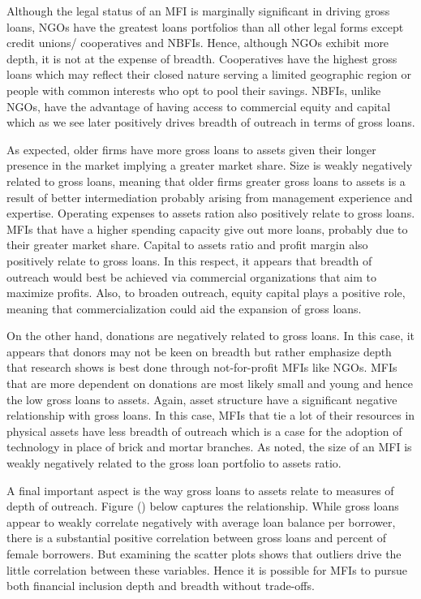 \documentclass[
]{article}
\begin{document}
Although the legal status of an MFI is marginally significant in driving
gross loans, NGOs have the greatest loans portfolios than all other
legal forms except credit unions/ cooperatives and NBFIs. Hence,
although NGOs exhibit more depth, it is not at the expense of breadth.
Cooperatives have the highest gross loans which may reflect their closed
nature serving a limited geographic region or people with common
interests who opt to pool their savings. NBFIs, unlike NGOs, have the
advantage of having access to commercial equity and capital which as we
see later positively drives breadth of outreach in terms of gross loans.

As expected, older firms have more gross loans to assets given their
longer presence in the market implying a greater market share. Size is
weakly negatively related to gross loans, meaning that older firms
greater gross loans to assets is a result of better intermediation
probably arising from management experience and expertise. Operating
expenses to assets ration also positively relate to gross loans. MFIs
that have a higher spending capacity give out more loans, probably due
to their greater market share. Capital to assets ratio and profit margin
also positively relate to gross loans. In this respect, it appears that
breadth of outreach would best be achieved via commercial organizations
that aim to maximize profits. Also, to broaden outreach, equity capital
plays a positive role, meaning that commercialization could aid the
expansion of gross loans.

On the other hand, donations are negatively related to gross loans. In
this case, it appears that donors may not be keen on breadth but rather
emphasize depth that research shows is best done through not-for-profit
MFIs like NGOs. MFIs that are more dependent on donations are most
likely small and young and hence the low gross loans to assets. Again,
asset structure have a significant negative relationship with gross
loans. In this case, MFIs that tie a lot of their resources in physical
assets have less breadth of outreach which is a case for the adoption of
technology in place of brick and mortar branches. As noted, the size of
an MFI is weakly negatively related to the gross loan portfolio to
assets ratio.

A final important aspect is the way gross loans to assets relate to
measures of depth of outreach. Figure () below captures the
relationship. While gross loans appear to weakly correlate negatively
with average loan balance per borrower, there is a substantial positive
correlation between gross loans and percent of female borrowers. But
examining the scatter plots shows that outliers drive the little
correlation between these variables. Hence it is possible for MFIs to
pursue both financial inclusion depth and breadth without trade-offs.
\end{document}
